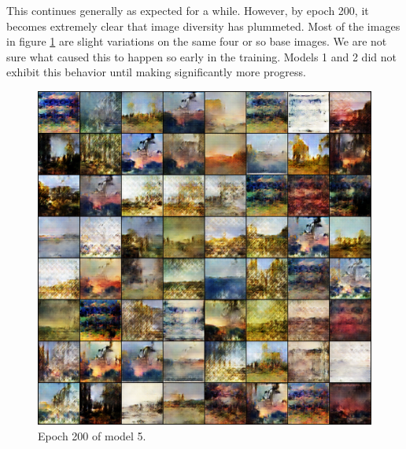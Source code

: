 \documentclass[11pt,letterpaper]{article}
\begin{document}
				This continues generally as expected for a while.
				However, by epoch 200, it becomes extremely clear that image diversity has plummeted.
				Most of the images in figure \ref{fig:wa128:epoch200generator} are slight variations on the same four or so base images.
				We are not sure what caused this to happen so early in the training.
				Models 1 and 2 did not exhibit this behavior until making significantly more progress.
				\begin{figure}
					\centering
					\includegraphics[width=1.0\linewidth]{results/model5/epoch200_generator}
					\caption{Epoch 200 of model 5.}
					\label{fig:wa128:epoch200generator}
				\end{figure}
\end{document}
